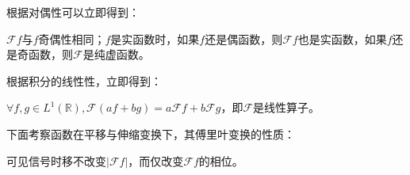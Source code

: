 根据对偶性可以立即得到：
\begin{theorem}[对称性]
    \label{thm:FT_symmetry}
    $\mathcal{F} f$与$f$奇偶性相同；$f$是实函数时，如果$f$还是偶函数，则$\mathcal{F} f$也是实函数，如果$f$还是奇函数，则$\mathcal{F} $是纯虚函数。
\end{theorem}

根据积分的线性性，立即得到：
\begin{theorem}[线性性]
    \label{thm:FT_linear}
    $\forall f,g\in L^1(\mathbb{R}),\mathcal{F} (af+bg)=a\mathcal{F} f+b\mathcal{F} g$，即$\mathcal{F} $是线性算子。
\end{theorem}

下面考察函数在平移与伸缩变换下，其傅里叶变换的性质：

\begin{theorem}[平移定理]
    \label{thm:FT_shift}
    \quad
\end{theorem}
可见信号时移不改变$|\mathcal{F} f|$，而仅改变$\mathcal{F} f$的相位。
